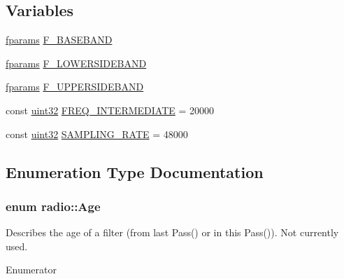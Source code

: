 \subsection*{Variables}
\begin{DoxyCompactItemize}
\item 
\hyperlink{definitions_8hpp_a7615684c2af56be5f302c5b367d71f6b}{fparams} \hyperlink{namespaceradio_a9bd902e9216499953a5906de73dc1796}{F\+\_\+\+B\+A\+S\+E\+B\+A\+N\+D}
\item 
\hyperlink{definitions_8hpp_a7615684c2af56be5f302c5b367d71f6b}{fparams} \hyperlink{namespaceradio_a0ffd57d5a11ff70a1f55dbdc8ebe098d}{F\+\_\+\+L\+O\+W\+E\+R\+S\+I\+D\+E\+B\+A\+N\+D}
\item 
\hyperlink{definitions_8hpp_a7615684c2af56be5f302c5b367d71f6b}{fparams} \hyperlink{namespaceradio_a0ec4548711b6d6ed6867c70b3fc2a413}{F\+\_\+\+U\+P\+P\+E\+R\+S\+I\+D\+E\+B\+A\+N\+D}
\item 
const \hyperlink{definitions_8hpp_a1134b580f8da4de94ca6b1de4d37975e}{uint32} \hyperlink{namespaceradio_aa82ddc6ba206798fd70ffc25665b3cb6}{F\+R\+E\+Q\+\_\+\+I\+N\+T\+E\+R\+M\+E\+D\+I\+A\+T\+E} = 20000
\item 
const \hyperlink{definitions_8hpp_a1134b580f8da4de94ca6b1de4d37975e}{uint32} \hyperlink{namespaceradio_a284213fea4beed2f74bb936927cbe654}{S\+A\+M\+P\+L\+I\+N\+G\+\_\+\+R\+A\+T\+E} = 48000
\end{DoxyCompactItemize}


\subsection{Enumeration Type Documentation}
\hypertarget{namespaceradio_a90839d95c13fa21f45e9cd380e38f1f3}{
\subsubsection[{Age}]{\setlength{\rightskip}{0pt plus 5cm}enum {\bf radio\+::\+Age}}}\label{namespaceradio_a90839d95c13fa21f45e9cd380e38f1f3}
Describes the age of a filter (from last Pass() or in this Pass()). Not currently used. \begin{Desc}
\item[Enumerator]\par
\begin{description}
\item[{\em 
\hypertarget{namespaceradio_a90839d95c13fa21f45e9cd380e38f1f3afbe8ecd067dc1095175b7cdc7cecbb82}{O\+L\+D}\label{namespaceradio_a90839d95c13fa21f45e9cd380e38f1f3afbe8ecd067dc1095175b7cdc7cecbb82}
}]\item[{\em 
\hypertarget{namespaceradio_a90839d95c13fa21f45e9cd380e38f1f3ac1a7d3b0b6d1c9639e94bdd8c8692686}{N\+E\+W}\label{namespaceradio_a90839d95c13fa21f45e9cd380e38f1f3ac1a7d3b0b6d1c9639e94bdd8c8692686}
}]\end{description}
\end{Desc}


